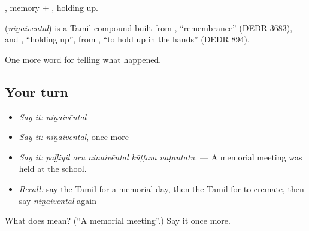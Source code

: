 , memory + , holding up.

\begin{cousinweb}
\textbf{} (\emph{niṉaivēntal}) is a Tamil compound built from , \textquotedblleft{}remembrance\textquotedblright{} (DEDR 3683), and , \textquotedblleft{}holding up\textquotedblright{}, from , \textquotedblleft{}to hold up in the hands\textquotedblright{} (DEDR 894).
\end{cousinweb}

\begin{grammarlens}[title={What you've built}]
One more word for telling what happened.
\end{grammarlens}

\subsection*{Your turn}
\begin{itemize}
\raggedright
  \item \emph{Say it:} \emph{niṉaivēntal}
  \item \emph{Say it:} \emph{niṉaivēntal}, once more
  \item \emph{Say it:} \emph{paḷḷiyil oru niṉaivēntal kūṭṭam naṭantatu.} — A memorial meeting was held at the school.
  \item \emph{Recall:} say the Tamil for a memorial day, then the Tamil for to cremate, then say \emph{niṉaivēntal} again
\end{itemize}

\begin{tcolorbox}[breakable,colback=teal!4,colframe=teal!35!black,title={Before you move on}]
What does  mean? (\textquotedblleft{}A memorial meeting\textquotedblright{}.) Say it once more.
\end{tcolorbox}
